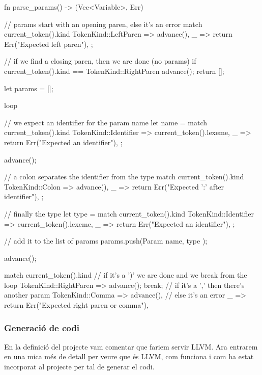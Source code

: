 ﻿\documentclass{article}
\begin{document}
\begin{code}
    fn parse_params() -> (Vec<Variable>, Err) {
        // params start with an opening paren, else it's an error
        match current_token().kind {
            TokenKind::LeftParen => advance(),
            _ => return Err("Expected left paren"),
        };

        // if we find a closing paren, then we are done (no params)
        if current_token().kind == TokenKind::RightParen {
            advance();
            return [];
        }

        let params = [];

        loop {
            // we expect an identifier for the param name
            let name = match current_token().kind {
                TokenKind::Identifier => current_token().lexeme,
                _ => return Err("Expected an identifier"),
            };

            advance();

            // a colon separates the identifier from the type
            match current_token().kind {
                TokenKind::Colon => advance(),
                _ => return Err("Expected ':' after identifier"),
            };

            // finally the type
            let type = match current_token().kind {
                TokenKind::Identifier => current_token().lexeme,
                _ => return Err("Expected an identifier"),
            };

            // add it to the list of params
            params.push(Param { name, type });

            advance();

            match current_token().kind {
                // if it's a ')' we are done and we break from the loop
                TokenKind::RightParen => {
                    advance();
                    break;
                }
                // if it's a ',' then there's another param
                TokenKind::Comma => advance(),
                // else it's an error
                _ => return Err("Expected right paren or comma"),
            }
        }
    }
\end{code}

\subsubsection{Generació de codi}
En la definició del projecte vam comentar que fariem servir LLVM. Ara entrarem
en una mica més de detall per veure que és LLVM, com funciona i com ha estat
incorporat al projecte per tal de generar el codi.
\end{document}

